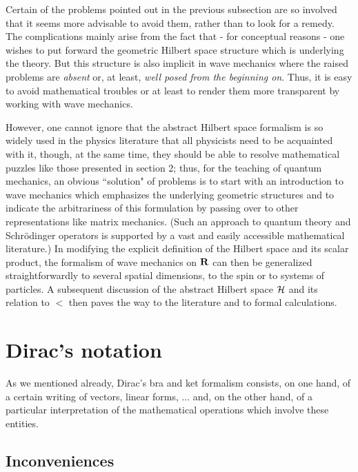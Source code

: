\documentclass[12pt]{report}
\begin{document}
Certain of the problems pointed out in the previous subsection 
are so involved that it seems more advisable to avoid them, rather 
than to 
look for a remedy. The complications mainly arise from the fact that 
- for conceptual reasons - one wishes to put forward 
the geometric Hilbert space structure which is underlying the theory.
But this structure is also implicit in wave mechanics
where the raised problems are {\em absent} or, at least,  
{\em well posed from the beginning on}. 
Thus, it is easy to avoid mathematical troubles or at least 
to render them more transparent by working with wave mechanics. 

However, one cannot ignore that 
the abstract Hilbert space formalism is 
so widely used in the physics literature 
that all physicists need to be acquainted  
with it, though, at the same time, they should 
be able to resolve mathematical puzzles like 
those  presented in section 2; 
thus,  for the teaching of quantum mechanics, an obvious 
``solution" of problems is to start with an introduction 
to wave mechanics which emphasizes the underlying geometric 
structures and to indicate the arbitrariness of this formulation 
by passing over to other representations like matrix mechanics.
(Such an approach to quantum theory and Schr\"odinger operators 
is supported by a vast and easily accessible 
mathematical literature.)
In modifying the explicit definition of the Hilbert space and its 
scalar product, the formalism of wave mechanics on  ${\bf R}$
can then be generalized straightforwardly
to several spatial dimensions, 
to the spin or to systems of particles.
A subsequent discussion of the abstract Hilbert space ${\cal H}$ 
and its relation to $\lt$ then paves the way to the literature
and to formal calculations. 



 
 
 
\section{Dirac's notation}
 
As we mentioned already, Dirac's bra and ket formalism 
consists, on one hand, of a certain writing of vectors, linear forms, ...
and, on the other hand, of a particular interpretation of the 
mathematical operations which involve these entities. 

 
 
\subsection{Inconveniences}
\end{document}
